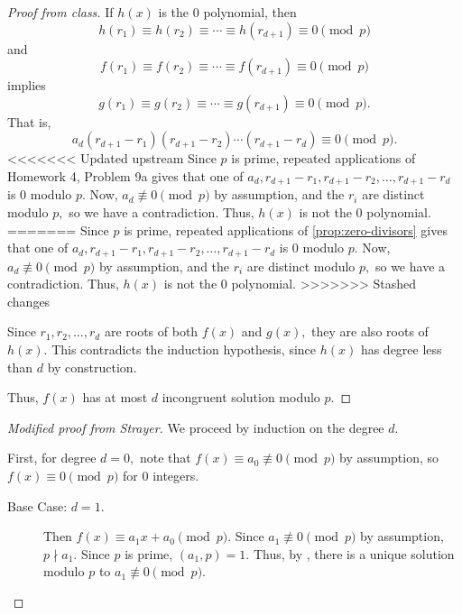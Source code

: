 \documentclass{ximera}
\begin{document}
\begin{theorem}[Lagrange]
\begin{proof}[Proof from class]
        If $h(x)$ is the $0$ polynomial, then 
        \[h(r_{1})\equiv h(r_2)\equiv\cdots\equiv h(r_{d+1})\equiv 0\pmod{p}\]
        and 
        \[f(r_{1})\equiv f(r_2)\equiv\cdots\equiv f(r_{d+1})\equiv 0\pmod{p}\]
        implies
        \[g(r_{1})\equiv g(r_2)\equiv\cdots\equiv g(r_{d+1})\equiv 0\pmod{p}.\]
        That is, 
        \[a_d(r_{d+1}-r_1)(r_{d+1}-r_2)\cdots(r_{d+1}-r_d)\equiv 0\pmod{p}.\]
<<<<<<< Updated upstream
        Since $p$ is prime, repeated applications of Homework 4, Problem 9a gives that one of $a_d,r_{d+1}-r_1,r_{d+1}-r_2,\dots,r_{d+1}-r_d$ is $0$ modulo $p.$ Now, $a_d\not\equiv0\pmod{p}$ by assumption, and the $r_i$ are distinct modulo $p,$ so we have a contradiction. Thus, $h(x)$ is not the $0$ polynomial. 
=======
        Since $p$ is prime, repeated applications of \cref{prop:zero-divisors} gives that one of $a_d,r_{d+1}-r_1,r_{d+1}-r_2,\dots,r_{d+1}-r_d$ is $0$ modulo $p.$ Now, $a_d\not\equiv0\pmod{p}$ by assumption, and the $r_i$ are distinct modulo $p,$ so we have a contradiction. Thus, $h(x)$ is not the $0$ polynomial. 
>>>>>>> Stashed changes

        Since $r_1,r_2,\dots,r_d$ are roots of both $f(x)$ and $g(x),$ they are also roots of $h(x).$ This contradicts the induction hypothesis, since $h(x)$ has degree less than $d$ by construction.

        Thus, $f(x)$ has at most $d$ incongruent solution modulo $p.$
    \end{proof}

    \begin{proof}[Modified proof from Strayer]
        We proceed by induction on the degree $d.$
        
        First, for degree $d=0,$ note that $f(x)\equiv a_0\not\equiv 0\pmod{p}$ by assumption, so $f(x)\equiv 0\pmod{p}$ for $0$ integers.
            
        \begin{description}
                
            \item[Base Case: $d=1$.] Then $f(x)\equiv a_1 x+a_0\pmod{p}$. Since $a_1\not\equiv 0\pmod{p}$ by assumption, $p\nmid a_1.$ Since $p$ is prime, $(a_1,p)=1.$ Thus, by , there is a unique solution modulo $p$ to $a_1\not\equiv 0\pmod{p}.$


\end{description}
\end{proof}
\end{theorem}
\end{document}
